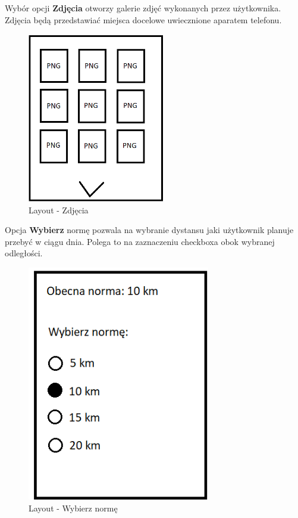 \newline Wybór opcji \textbf{Zdjęcia} otworzy galerie zdjęć wykonanych przez użytkownika. Zdjęcia będą przedstawiać miejsca docelowe uwiecznione aparatem telefonu.
\begin{figure}[!htb]
	\begin{center}
		\includegraphics[width=6cm]{rys/Zdjęcia.png}
		\caption{Layout - Zdjęcia}
		\label{rys:rysunek005}
	\end{center}
\end{figure}
\newline
\newline Opcja \textbf{Wybierz} normę pozwala na wybranie dystansu jaki użytkownik planuje przebyć w ciągu dnia. Polega to na zaznaczeniu checkboxa obok wybranej odległości.
\begin{figure}[!htb]
	\begin{center}
		\includegraphics[width=8cm]{rys/Wybierz.png}
		\caption{Layout - Wybierz normę}
		\label{rys:rysunek006}
	\end{center}
\end{figure}
 
 